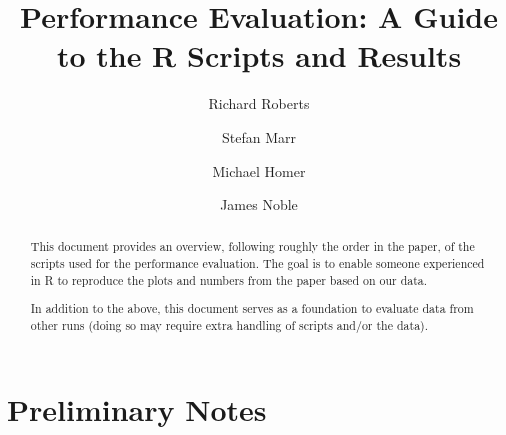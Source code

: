 \documentclass[a4paper,USenglish]{darts-v2019}
\title{Performance Evaluation: A Guide to the R Scripts and Results}
\author{Richard Roberts}{School of Design, Victoria University of Wellington}{rykardo.r@gmail.com}{https://orcid.org/0000-0002-3462-8539}{}
\author{Stefan Marr}{School of Computing, University of Kent}{s.marr@kent.ac.uk}{https://orcid.org0000-0001-9059-5180}{}
\author{Michael Homer}{School of Engineering and Computer Science, Victoria University of Wellington}{mwh@ecs.vuw.ac.nz}{}{}
\author{James Noble}{School of Engineering and Computer Science, Victoria University of Wellington}{kjx@ecs.vuw.ac.nz}{https://orcid.org/0000-0001-9036-5692}{}
\begin{document}
\maketitle

\begin{abstract}
This document provides an overview,
following roughly the order in the paper,
of the scripts used for the performance evaluation.
The goal is to enable
someone experienced in R
to reproduce the plots and numbers from the paper
based on our data.

In addition to the above, this document serves as  
a foundation to evaluate data from other runs
(doing so may require extra handling of scripts and/or the data).
\end{abstract}

\section{Preliminary Notes}
\end{document}
